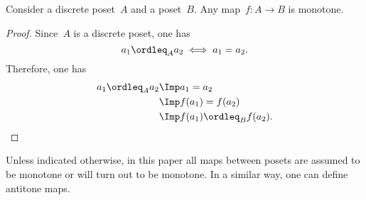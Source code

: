 \begin{lemma}
    Consider a discrete poset~$A$ and a poset~$B$. Any map~$f\colon A\to B$ is monotone.
\end{lemma}
\begin{proof}
    Since~$A$ is a discrete poset, one has
    \begin{equation}
        a_1\ordleq_A a_2 \iff a_1=a_2.
    \end{equation}
    Therefore, one has
    \begin{equation}
        \begin{aligned}
            a_1\ordleq_A a_2 &\Imp a_1=a_2\\
            &\Imp f(a_1)=f(a_2)\\
            &\Imp f(a_1)\ordleq_B f(a_2).
        \end{aligned}
    \end{equation}
\end{proof}
Unless indicated otherwise, in this paper all maps between posets are assumed to be monotone or will turn out to be monotone. In a similar way, one can define antitone maps.


